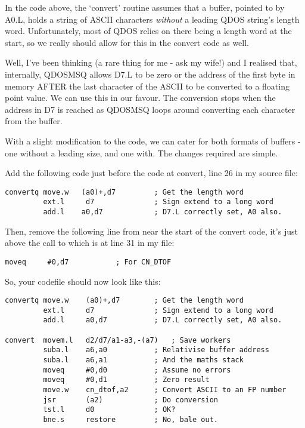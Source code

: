 In the code above, the `convert' routine assumes that a buffer, pointed
to by A0.L, holds a string of ASCII characters \emph{without} a leading QDOS
string's length word. Unfortunately, most of QDOS relies on there being a length word at
the start, so we really should allow for this in the convert code as well.

Well, I've been thinking (a rare thing for me -{} ask my wife!) and I realised
that, internally, QDOSMSQ allows D7.L to be zero or the address of the first
byte in memory AFTER the last character of the ASCII to be converted to a
floating point value. We can use this in our favour. The conversion stops when
the address in D7 is reached as QDOSMSQ loops around converting each character
from the buffer.

With a slight modification to the code, we can cater for both formats of
buffers -{} one without a leading size, and one with. The changes required are
simple.

Add the following code just before the code at convert, line 26 in my source file:

\begin{lstlisting}[firstnumber=26,caption={Better ASCII to LONG Converter - Converq}]
convertq move.w   (a0)+,d7         ; Get the length word
         ext.l     d7              ; Sign extend to a long word
         add.l    a0,d7            ; D7.L correctly set, A0 also.
\end{lstlisting}

Then, remove the following line from near the start of the convert code, it's
just above the call to  which is at line 31 in my file:

\begin{lstlisting}[firstnumber=31,]
         moveq     #0,d7           ; For CN_DTOF
\end{lstlisting}

So, your codefile should now look like this:

\begin{lstlisting}[firstnumber=26,caption={Better ASCII to LONG Converter - Part 1}]
convertq move.w    (a0)+,d7        ; Get the length word
         ext.l     d7              ; Sign extend to a long word
         add.l     a0,d7           ; D7.L correctly set, A0 also.

convert  movem.l   d2/d7/a1-a3,-(a7)   ; Save workers
         suba.l    a6,a0           ; Relativise buffer address
         suba.l    a6,a1           ; And the maths stack
         moveq     #0,d0           ; Assume no errors
         moveq     #0,d1           ; Zero result
         move.w    cn_dtof,a2      ; Convert ASCII to an FP number
         jsr       (a2)            ; Do conversion
         tst.l     d0              ; OK?
         bne.s     restore         ; No, bale out.
\end{lstlisting}

